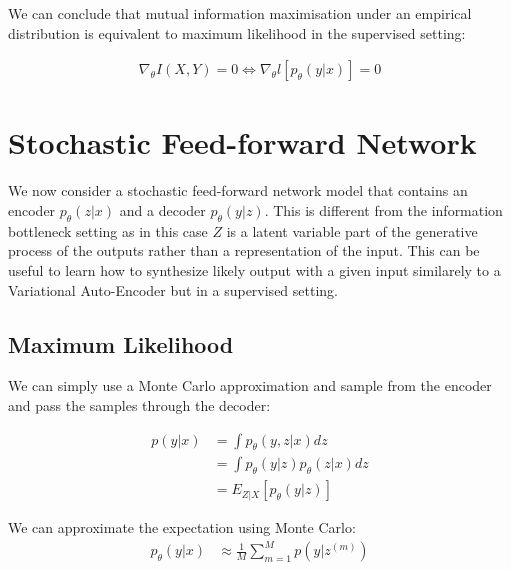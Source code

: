 \documentclass[10pt,oneside,openright]{report}
\begin{document}
We can conclude that mutual information maximisation under an empirical distribution is equivalent to maximum likelihood in the supervised setting:

\begin{align}
\nabla_\theta I(X,Y) = 0 \Leftrightarrow \nabla_\theta l[p_\theta(y|x)] = 0
\end{align}

\section{Stochastic Feed-forward Network}

We now consider a stochastic feed-forward network model that contains an encoder $p_\theta(z|x)$ and a decoder $p_\theta(y|z)$. This is different from the information bottleneck setting as in this case $Z$ is a latent variable part of the generative process of the outputs rather than a representation of the input. This can be useful to learn how to synthesize likely output with a given input similarely to a Variational Auto-Encoder \cite{vae} but in a supervised setting.

\begin{figure}[H]
\centering
{}
\end{figure}

\subsection{Maximum Likelihood}

We can simply use a Monte Carlo approximation and sample from the encoder and pass the samples through the decoder:

\begin{align}
 p(y|x) &= \int p_\theta(y, z|x) dz \\
 &= \int p_\theta(y|z) p_\theta(z|x) dz \\
 &= E_{Z | X}[p_\theta(y|z)] 
\end{align}

We can approximate the expectation using Monte Carlo:
\begin{align}
 p_\theta(y|x) &\approx \frac{1}{M} \sum^M_{m=1} p(y | z^{(m)}) 
\end{align}
\end{document}
